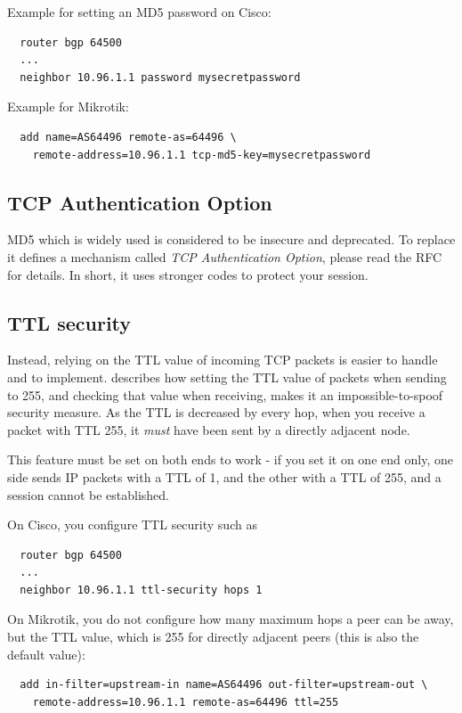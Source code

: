 Example for setting an MD5 password on Cisco:
\begin{verbatim}
  router bgp 64500
  ...
  neighbor 10.96.1.1 password mysecretpassword
\end{verbatim}

Example for Mikrotik:
\begin{verbatim}
  add name=AS64496 remote-as=64496 \
    remote-address=10.96.1.1 tcp-md5-key=mysecretpassword
\end{verbatim}

\subsection{TCP Authentication Option}
\gls{MD5} which is widely used is considered to be insecure and deprecated. To replace it  defines a mechanism called \emph{TCP Authentication Option}, please read the RFC for details. In short, it uses stronger codes to protect your session.

\subsection{TTL security}
Instead, relying on the \gls{TTL} value of incoming TCP packets is easier to handle and to implement.  describes how setting the TTL value of packets when sending to 255, and checking that value when receiving, makes it an impossible-to-spoof security measure. As the TTL is decreased by every hop, when you receive a packet with TTL 255, it \emph{must} have been sent by a directly adjacent node.

This feature must be set on both ends to work - if you set it on one end only, one side sends IP packets with a \gls{TTL} of 1, and the other with a \gls{TTL} of 255, and a session cannot be established.


On Cisco, you configure TTL security such as
\begin{verbatim}
  router bgp 64500
  ...
  neighbor 10.96.1.1 ttl-security hops 1
\end{verbatim}

On Mikrotik, you do not configure how many maximum hops a peer can be away, but the TTL value, which is 255 for directly adjacent peers (this is also the default value):
\begin{verbatim}
  add in-filter=upstream-in name=AS64496 out-filter=upstream-out \
    remote-address=10.96.1.1 remote-as=64496 ttl=255
\end{verbatim}

